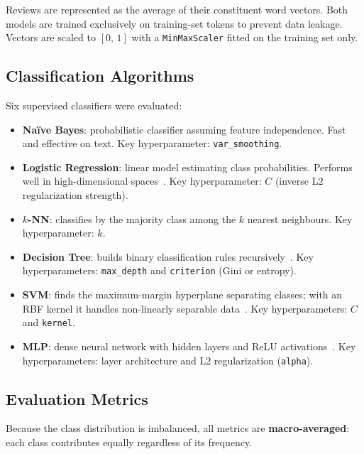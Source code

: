 \documentclass[12pt, letterpaper]{article}
\begin{document}
Reviews are represented as the average of their constituent word vectors.
Both models are trained exclusively on training-set tokens to prevent data
leakage. Vectors are scaled to $[0,\,1]$ with a \texttt{MinMaxScaler}
fitted on the training set only.

\subsection{Classification Algorithms}

Six supervised classifiers were evaluated:

\begin{itemize}
  \item \textbf{Naïve Bayes}: probabilistic classifier assuming feature
    independence. Fast and effective on text. Key hyperparameter:
    \texttt{var\_smoothing}.
  \item \textbf{Logistic Regression}: linear model estimating class
    probabilities. Performs well in high-dimensional spaces~\cite{lovera2023}.
    Key hyperparameter: $C$ (inverse L2 regularization strength).
  \item \textbf{$k$-NN}: classifies by the majority class among the $k$
    nearest neighbours. Key hyperparameter: $k$.
  \item \textbf{Decision Tree}: builds binary classification rules
    recursively~\cite{sklearn}. Key hyperparameters: \texttt{max\_depth}
    and \texttt{criterion} (Gini or entropy).
  \item \textbf{SVM}: finds the maximum-margin hyperplane separating classes;
    with an RBF kernel it handles non-linearly separable data~\cite{cortes1995}.
    Key hyperparameters: $C$ and \texttt{kernel}.
  \item \textbf{MLP}: dense neural network with hidden layers and ReLU
    activations~\cite{sklearn}. Key hyperparameters: layer architecture and
    L2 regularization (\texttt{alpha}).
\end{itemize}

\subsection{Evaluation Metrics}

Because the class distribution is imbalanced, all metrics are
\textbf{macro-averaged}: each class contributes equally regardless of its
frequency.
\end{document}
